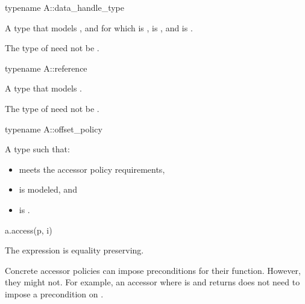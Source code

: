 \begin{itemdecl}
typename A::data_handle_type
\end{itemdecl}

\begin{itemdescr}
\pnum
\result
A type that models , and
for which  is ,
 is , and
 is .
\begin{note}
The type of  need not be .
\end{note}
\end{itemdescr}

\begin{itemdecl}
typename A::reference
\end{itemdecl}

\begin{itemdescr}
\pnum
\result
A type that models
.
\begin{note}
The type of  need not be .
\end{note}
\end{itemdescr}

\begin{itemdecl}
typename A::offset_policy
\end{itemdecl}

\begin{itemdescr}
\pnum
\result
A type  such that:

\begin{itemize}
\item
{} meets the accessor policy requirements,
\item
{} is modeled, and
\item
{} is .
\end{itemize}
\end{itemdescr}

\begin{itemdecl}
a.access(p, i)
\end{itemdecl}

\begin{itemdescr}
\pnum
\result
{}

\pnum
\remarks
The expression is equality preserving.

\pnum
\begin{note}
Concrete accessor policies can impose preconditions for their  function.
However, they might not.
For example, an accessor where
 is  and
 returns 
does not need to impose a precondition on .
\end{note}
\end{itemdescr}

